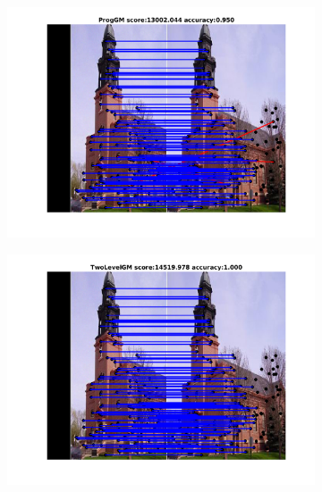 \documentclass[
	fontsize=12pt,
	paper=a4,
	twoside=false,
	numbers=noenddot,
	plainheadsepline,
	toc=listof,
	toc=bibliography
]{scrartcl}
\begin{document}
\begin{figure}[h]
	\begin{subfigure}[b]{0.33\textwidth}
		\centering
		\includegraphics[scale=0.25]{"fig_ver2608/RealImages/ImgTrafo/anchor_descr/using_cpd_afftrafo/fi_3_ProgGM"} 
	\end{subfigure}%
	\begin{subfigure}[b]{0.33\textwidth}
		\centering
		\includegraphics[scale=0.25]{"fig_ver2608/RealImages/ImgTrafo/anchor_descr/using_cpd_afftrafo/fi_3_TwoLevelGM"} 
	\end{subfigure} 
	\begin{subfigure}[b]{0.33\textwidth}
		\centering

\end{subfigure}
\end{figure}
\end{document}
